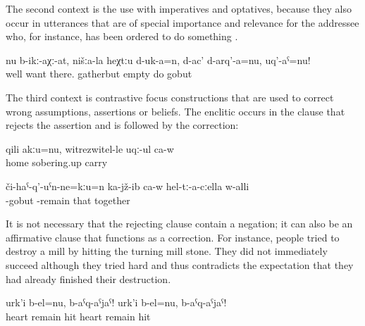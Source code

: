 The second context is the use with imperatives and optatives, because they also occur in utterances that are of special importance and relevance for the addressee who, for instance, has been ordered to do something .
%
\begin{exe}
	\ex	\label{ex:‎‎‎If you want, take the (stuff) and empty it here in our place, go minor}
	\gll	nu	b-ikː-aχː-at,	nišːa-la	heχtːu	d-uk-a=n,	d-ac'	d-arq'-a=nu,	uq'-aˁ=nu!\\
		well	want		there.	gatherbut	\tsc{npl-}empty	do		gobut\\
	\glt	{}
\end{exe}

The third context is contrastive focus constructions that are used to correct wrong assumptions, assertions or beliefs. The enclitic occurs in the clause that rejects the assertion and is followed by the correction:
%
\begin{exe}
	\ex	\label{ex:‎No, not home, they take him to the sobering-up station minor}
	\gll	qili	akːu=nu,	witrezwitel-le	uqː-ul	ca-w\\
		home		sobering.up	carry	\\
	\glt	{}

	\ex	\label{ex:‎No, he is not going towards them, but sitting together with them minor}
	\gll	či-haˁ-q'-uˁn-ne=kːu=n	ka-jž-ib	ca-w	hel-tː-a-cːella	w-alli\\
		-gobut	-remain		that	together\\
	\glt	{}
\end{exe}

It is not necessary that the rejecting clause contain a negation; it can also be an affirmative clause that functions as a correction. For instance, people tried to destroy a mill by hitting the turning mill stone. They did not immediately succeed although they tried hard and thus  contradicts the expectation that they had already finished their destruction.
%
\begin{exe}
	\ex	\label{ex:The heart remained, hit it! The heart remained, hit it minor}
	\gll	urk'i	b-el=nu,	b-aˁq-aˁjaˁ!	urk'i	b-el=nu,	b-aˁq-aˁjaˁ!\\
		heart	remain	hit	heart	\tsc{n-}remain hit\\
	\glt	{}
\end{exe}


